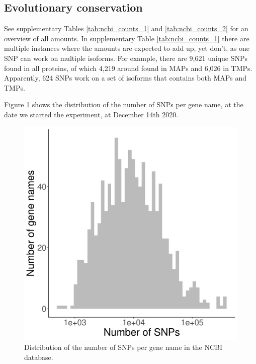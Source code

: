 \subsection{Evolutionary conservation}

See supplementary Tables \ref{tab:ncbi_counts_1} and \ref{tab:ncbi_counts_2}
for an overview of all amounts.
In supplementary Table \ref{tab:ncbi_counts_1} there are multiple instances where
the amounts are expected to add up, yet don't, as one SNP can work on
multiple isoforms. For example, there are 9,621 unique SNPs 
found in all proteins, of which 4,219 around found in MAPs 
and 6,026 in TMPs. Apparently, 624 SNPs work on a set of isoforms that
contains both MAPs and TMPs.





Figure \ref{fig:snps_per_gene_name_ncbi} shows the distribution of the
number of SNPs per gene name, at the date we started the experiment,
at December 14th 2020.

\begin{figure}[!htbp]
  \includegraphics[width=\textwidth]{ncbi_peregrine_results/fig_snps_per_gene_name_ncbi.png}
  \caption{
    Distribution of the number of SNPs per gene name in the NCBI database.
  }
  \label{fig:snps_per_gene_name_ncbi}
\end{figure}

